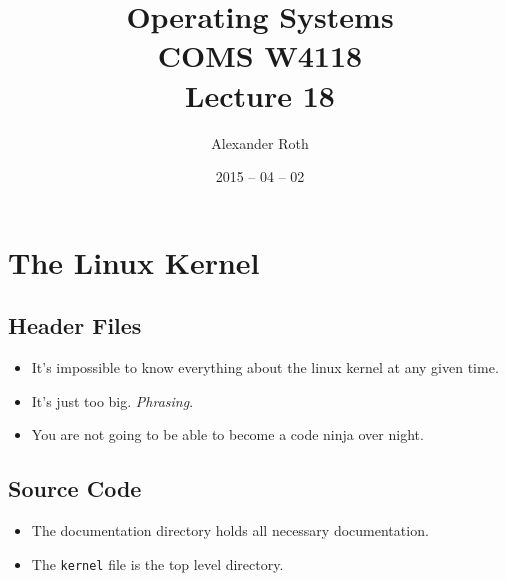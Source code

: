 \documentclass[]{article}
\begin{document}
\newcommand{\code}{\texttt}
\newtheorem{thm}{Theorem}
\title{Operating Systems \\ COMS W4118 \\ Lecture 18}
\author{Alexander Roth}
\date{2015 -- 04 -- 02}
\maketitle

\section{The Linux Kernel}
\subsection{Header Files}
\begin{itemize}
\item It's impossible to know everything about the linux kernel at any given
time.
\item It's just too big. \emph{Phrasing}.
\item You are not going to be able to become a code ninja over night.
\end{itemize}

\subsection{Source Code}
\begin{itemize}
\item The documentation directory holds all necessary documentation.
\item The \code{kernel} file is the top level directory.
\end{itemize}
\end{document}
